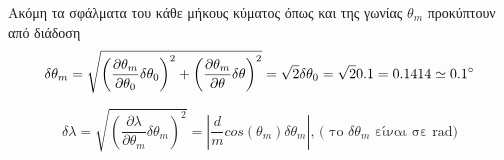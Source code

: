 \documentclass[a4paper]{article}
\begin{document}
Ακόμη τα σφάλματα του κάθε μήκους κύματος όπως και της γωνίας $\theta_m$ προκύπτουν από διάδοση 
$$ \delta\theta_m = \sqrt{ \left(\pdv{\theta_m}{\theta_0}\delta\theta_0\right)^2 + \left(\pdv{\theta_m}{\theta}\delta\theta\right)^2} =
 	\sqrt{2}\delta\theta_0 = \sqrt{2}  0.1 = 0.1414 \simeq 0.1^{\circ}  $$%
 	
$$\delta\lambda=\sqrt{\left( \frac{\partial\lambda}{\partial\theta_m}\delta\theta_m\right)^2}= \left| \frac{d}{m}cos(\theta_m)\delta			\theta_m\right| \text{, ( το $\delta\theta_m$ είναι σε rad})$$



\end{document}
